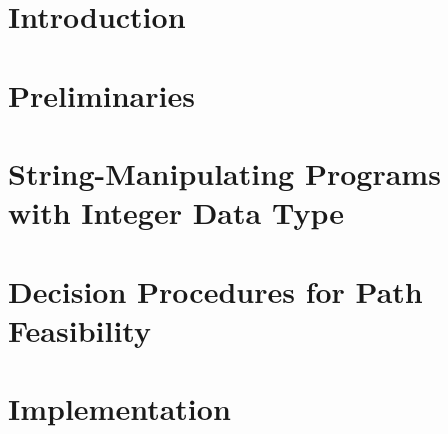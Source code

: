 \documentclass{llncs}
\begin{document}
\section{Introduction}

%
%
%
%
%
%
%




\section{Preliminaries}\label{sec:prel}




\section{String-Manipulating Programs with Integer Data Type}\label{sec:logic}





%


\section{Decision Procedures for Path Feasibility}\label{sec:dec}




\section{Implementation}



\end{document}
